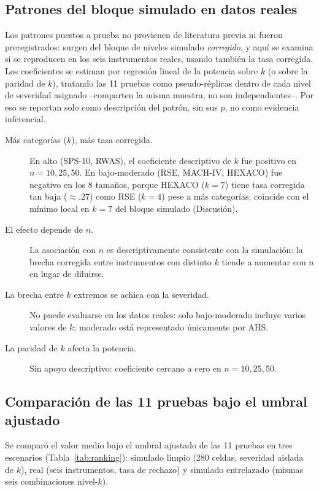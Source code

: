 \documentclass[man,mask,donotrepeattitle,floatsintext]{apa7}
\begin{document}
\subsection{Patrones del bloque simulado en datos reales}
\label{sec:res-patrones}

Los patrones puestos a prueba no provienen de literatura previa ni fueron preregistrados: surgen del bloque de niveles simulado \emph{corregido}, y aquí se examina si se reproducen en los seis instrumentos reales, usando también la tasa corregida. Los coeficientes se estiman por regresión lineal de la potencia sobre $k$ (o sobre la paridad de $k$), tratando las 11 pruebas como pseudo-réplicas dentro de cada nivel de severidad asignado --comparten la misma muestra, no son independientes--. Por eso se reportan solo como descripción del patrón, sin sus $p$, no como evidencia inferencial.

\begin{description}
\item[Más categorías ($k$), más tasa corregida.] En alto (SPS-10, RWAS), el coeficiente descriptivo de $k$ fue positivo en $n=10,25,50$. En bajo-moderado (RSE, MACH-IV, HEXACO) fue negativo en los 8 tamaños, porque HEXACO ($k=7$) tiene tasa corregida tan baja ($\approx.27$) como RSE ($k=4$) pese a más categorías: coincide con el mínimo local en $k=7$ del bloque simulado (Discusión).
\item[El efecto depende de $n$.] La asociación con $n$ es descriptivamente consistente con la simulación: la brecha corregida entre instrumentos con distinto $k$ tiende a aumentar con $n$ en lugar de diluirse.
\item[La brecha entre $k$ extremos se achica con la severidad.] No puede evaluarse en los datos reales: solo bajo-moderado incluye varios valores de $k$; moderado está representado únicamente por AHS.
\item[La paridad de $k$ afecta la potencia.] Sin apoyo descriptivo: coeficiente cercano a cero en $n=10,25,50$.
\end{description}

\subsection{Comparación de las 11 pruebas bajo el umbral ajustado}
\label{sec:res-comparacion}

Se comparó el valor medio bajo el umbral ajustado de las 11 pruebas en tres escenarios (Tabla~\ref{tab:ranking}): simulado limpio (280 celdas, severidad aislada de $k$), real (seis instrumentos, tasa de rechazo) y simulado entrelazado (mismas seis combinaciones nivel-$k$).
\end{document}

